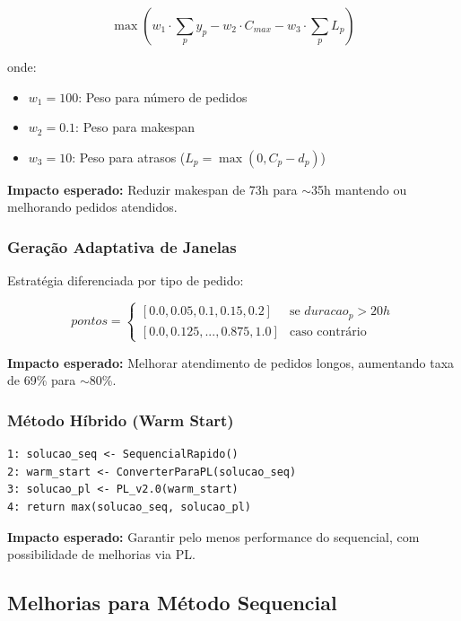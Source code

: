 \documentclass[11pt,a4paper]{article}
\begin{document}
\begin{equation}
\max \left( w_1 \cdot \sum_p y_p - w_2 \cdot C_{max} - w_3 \cdot \sum_p L_p \right)
\end{equation}

onde:
\begin{itemize}
    \item $w_1 = 100$: Peso para número de pedidos
    \item $w_2 = 0.1$: Peso para makespan
    \item $w_3 = 10$: Peso para atrasos ($L_p = \max(0, C_p - d_p)$)
\end{itemize}

\textbf{Impacto esperado:} Reduzir makespan de 73h para $\sim$35h mantendo ou melhorando pedidos atendidos.

\subsubsection{Geração Adaptativa de Janelas}

Estratégia diferenciada por tipo de pedido:

\begin{equation}
pontos = \begin{cases}
[0.0, 0.05, 0.1, 0.15, 0.2] & \text{se } duracao_p > 20h \\
[0.0, 0.125, ..., 0.875, 1.0] & \text{caso contrário}
\end{cases}
\end{equation}

\textbf{Impacto esperado:} Melhorar atendimento de pedidos longos, aumentando taxa de 69\% para $\sim$80\%.

\subsubsection{Método Híbrido (Warm Start)}

\begin{lstlisting}[caption={Algoritmo Híbrido}]
1: solucao_seq <- SequencialRapido()
2: warm_start <- ConverterParaPL(solucao_seq)
3: solucao_pl <- PL_v2.0(warm_start)
4: return max(solucao_seq, solucao_pl)
\end{lstlisting}

\textbf{Impacto esperado:} Garantir pelo menos performance do sequencial, com possibilidade de melhorias via PL.

\subsection{Melhorias para Método Sequencial}
\end{document}
